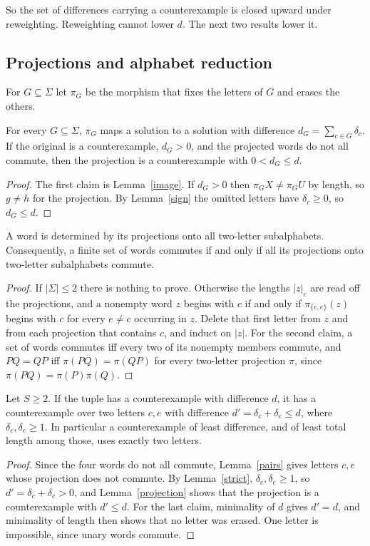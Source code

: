 So the set of differences carrying a counterexample is closed upward under reweighting. Reweighting cannot lower \(d\). The next two results lower it.

\subsection{Projections and alphabet reduction}
For \(G\subseteq\Sigma\) let \(\pi_G\) be the morphism that fixes the letters of \(G\) and erases the others.

\begin{lemma}[Projection]\label{projection}
For every \(G\subseteq\Sigma\), \(\pi_G\) maps a solution to a solution with difference \(d_G=\sum_{c\in G}\delta_c\). If the original is a counterexample, \(d_G>0\), and the projected words do not all commute, then the projection is a counterexample with \(0<d_G\le d\).
\end{lemma}
\begin{proof}
The first claim is Lemma~\ref{image}. If \(d_G>0\) then \(\pi_GX\ne\pi_GU\) by length, so \(g\ne h\) for the projection. By Lemma~\ref{sign} the omitted letters have \(\delta_c\ge0\), so \(d_G\le d\).
\end{proof}

\begin{lemma}\label{pairs}
A word is determined by its projections onto all two-letter subalphabets. Consequently, a finite set of words commutes if and only if all its projections onto two-letter subalphabets commute.
\end{lemma}
\begin{proof}
If \(|\Sigma|\le2\) there is nothing to prove. Otherwise the lengths \(|z|_c\) are read off the projections, and a nonempty word \(z\) begins with \(c\) if and only if \(\pi_{\{c,e\}}(z)\) begins with \(c\) for every \(e\ne c\) occurring in \(z\). Delete that first letter from \(z\) and from each projection that contains \(c\), and induct on \(|z|\). For the second claim, a set of words commutes iff every two of its nonempty members commute, and \(PQ=QP\) iff \(\pi(PQ)=\pi(QP)\) for every two-letter projection \(\pi\), since \(\pi(PQ)=\pi(P)\pi(Q)\).
\end{proof}

\begin{theorem}\label{alphabet}
Let \(S\ge2\). If the tuple has a counterexample with difference \(d\), it has a counterexample over two letters \(c,e\) with difference \(d'=\delta_c+\delta_e\le d\), where \(\delta_c,\delta_e\ge1\). In particular a counterexample of least difference, and of least total length among those, uses exactly two letters.
\end{theorem}
\begin{proof}
Since the four words do not all commute, Lemma~\ref{pairs} gives letters \(c,e\) whose projection does not commute. By Lemma~\ref{strict}, \(\delta_c,\delta_e\ge1\), so \(d'=\delta_c+\delta_e>0\), and Lemma~\ref{projection} shows that the projection is a counterexample with \(d'\le d\). For the last claim, minimality of \(d\) gives \(d'=d\), and minimality of length then shows that no letter was erased. One letter is impossible, since unary words commute.
\end{proof}

